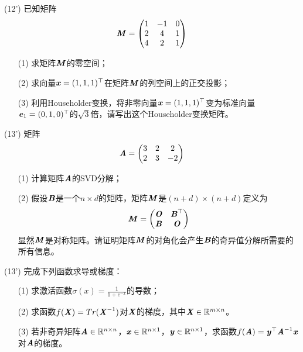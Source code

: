 \documentclass[12pt,a4paper,openany,twoside]{ctexbook}
\begin{document}
\begin{exercise}(12')
	已知矩阵\[ \MM = \begin{pmatrix}
		1&-1&0\\2&4&1\\4&2&1
	\end{pmatrix}
	\]
	
	\begin{itemize}
		\item [(1)] 求矩阵$\MM$的零空间；
		\item [(2)] 求向量$\Vx=(1,1,1)^{\top}$在矩阵$\MM$的列空间上的正交投影；
		\item [(3)] 利用Householder变换，将非零向量$\Vx=(1, 1, 1)^{\top}$变为标准向量$\Ve_1=(0,1,0)^{\top}$的$\sqrt{3}$倍，请写出这个Householder变换矩阵。
	\end{itemize}
	
\end{exercise}

\begin{exercise}(13')
	矩阵\[ \MA = \begin{pmatrix}
		3&2&2\\
		2&3&-2
	\end{pmatrix}
 \]
 \begin{itemize}
 	\item [(1)] 计算矩阵$ \MA $的SVD分解；
 	\item [(2)] 假设$\MB$是一个$n \times d$的矩阵，矩阵$\MM$是$(n+d) \times (n+d)$定义为
 	$$\MM=\begin{pmatrix}
 		\MO& \MB^\top\\
 		\MB& \MO\end{pmatrix}$$
 	显然$\MM$是对称矩阵。请证明矩阵$\MM$的对角化会产生$\MB$的奇异值分解所需要的所有信息。
 \end{itemize}
\end{exercise}

\begin{exercise}(13')
	完成下列函数求导或梯度：
	\begin{itemize}
		\item [(1)] 求激活函数$\sigma(x)=\frac{1}{1+e^{-x}}$的导数；
		\item [(2)] 求函数$f(\MX) = Tr(\MX^{-1})$对$\MX$的梯度，其中$\MX \in \NR^{m\times n} $。
		\item [(3)] 若非奇异矩阵$\MA \in \NR^{n \times n}$，$\Vx \in \NR^{n \times 1}$，$\Vy \in \NR^{n \times 1}$，求函数$f(\MA) = \Vy^\top \MA^{-1} \Vx$对$\MA$的梯度。
	\end{itemize}
\end{exercise}
\end{document}
